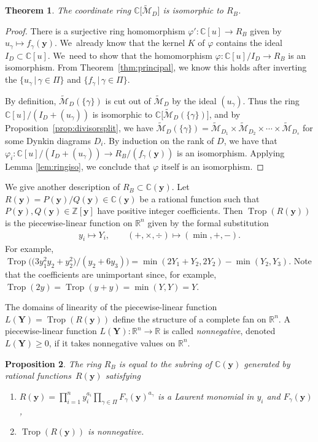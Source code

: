 \documentclass[pdftex]{sigma}%
\def\R{{\mathbb R}}
\def\C{{\mathbb C}}
\def\Z{{\mathbb Z}}
\def\tM{{\widetilde {\mathcal{M}}}}
\def\y{{\mathbf y}}
\def\Trop{\operatorname{Trop}}
\def\Y{{\mathbf Y}}
\numberwithin{equation}{section}
\newtheorem{Theorem}{Theorem}[section]
\newtheorem{Proposition}[Theorem]{Proposition}
\begin{document}
\begin{Theorem}\label{thm:RDisom}
The coordinate ring $\C\big[\tM_D\big]$ is isomorphic to $R_B$. \end{Theorem}
\begin{proof}
There is a surjective ring homomorphism $\varphi'\colon \C[u] \to R_B$ given by $u_\gamma \mapsto f_\gamma(\y)$. We~already know that the kernel $K$ of $\varphi$ contains the ideal $I_D \subset \C[u]$. We~need to show that the homomorphism $\varphi\colon \C[u]/I_D \to R_B$ is an isomorphism. From Theorem~\ref{thm:principal}, we know this holds after inverting the $\{u_\gamma \,|\, \gamma \in \Pi\}$ and $\{f_\gamma \,|\, \gamma \in \Pi\}$.

By definition, $\tM_D(\{\gamma\})$ is cut out of $\tM_D$ by the ideal $(u_\gamma)$. Thus the ring $\C[u]/(I_D+(u_\gamma))$ is isomorphic to $\C\big[\tM_D(\{\gamma\})\big]$, and by Proposition~\ref{prop:divisorsplit}, we have $\tM_D(\{\gamma\}) = \tM_{D_1} \times \tM_{D_2} \times \cdots \allowbreak \times \tM_{D_s}$ for some Dynkin diagrams $D_i$. By induction on the rank of $D$, we have that $\varphi_i\colon \C[u]/\allowbreak(I_D+(u_\gamma)) \to R_B/(f_\gamma(\y))$ is an isomorphism. Applying Lemma \ref{lem:ringiso}, we conclude that $\varphi$ itself is an isomorphism.
\end{proof}

\bigskip{}
We give another description of $R_B \subset \C(\y)$. Let~$R(\y) = P(\y)/Q(\y) \in \C(\y)$ be a rational function such that $P(\y),Q(\y) \in \Z[\y]$ have positive integer coefficients. Then $\Trop(R(\y))$ is the piecewise-linear function on $\R^n$ given by the formal substitution
\begin{gather*}
y_i \mapsto Y_i, \qquad (+, \times, \div) \mapsto (\min, + , -).
\end{gather*}
For example, $\Trop\big(\big(3y_1^2y_2 + y_2^2\big)/(y_2+6y_3)\big) = \min(2Y_1+Y_2,2Y_2)-\min(Y_2,Y_3)$. Note that the coefficients are unimportant since, for example, $\Trop(2y) = \Trop(y+y) = \min(Y,Y) = Y$.

The domains of linearity of the piecewise-linear function $L(\Y) = \Trop(R(\y))$ define the structure of a complete fan on $\R^n$. A piecewise-linear function $L(\Y)\colon \R^n \to \R$ is called \emph{nonnegative}, denoted $L(\Y)\geq 0$, if it takes nonnegative values on $\R^n$.

\begin{Proposition}\label{prop:RD}
The ring $R_B$ is equal to the subring of $\C(\y)$ generated by rational functions~$R(\y)$ satisfying \begin{enumerate}\itemsep=0pt
\item[$(1)$]
$R(\y) = \prod_{i=1}^n y_i^{a_i} \prod_{\gamma \in \Pi} F_\gamma(\y)^{a_\gamma}$ is a Laurent monomial in $y_i$ and $F_\gamma(\y)$,
\item[$(2)$]
$\Trop(R(\y))$ is nonnegative.
\end{enumerate}
\end{Proposition}
\end{document}
